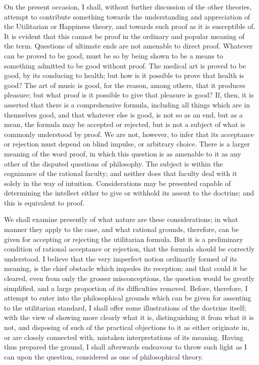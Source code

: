 \documentclass[12pt]{report}
\begin{document}
On the present occasion, I shall, without further discussion of the other theories, attempt to contribute something towards the understanding and appreciation of the Utilitarian or Happiness theory, and towards such proof as it is susceptible of. It is evident that this cannot be proof in the ordinary and popular meaning of the term. Questions of ultimate ends are not amenable to direct proof. Whatever can be proved to be good, must be so by being shown to be a means to something admitted to be good without proof. The medical art is proved to be good, by its conducing to health; but how is it possible to prove that health is good? The art of music is good, for the reason, among others, that it produces pleasure; but what proof is it possible to give that pleasure is good? If, then, it is asserted that there is a comprehensive formula, including all things which are in themselves good, and that whatever else is good, is not so as an end, but as a mean, the formula may be accepted or rejected, but is not a subject of what is commonly understood by proof. We are not, however, to infer that its acceptance or rejection must depend on blind impulse, or arbitrary choice. There is a larger meaning of the word proof, in which this question is as amenable to it as any other of the disputed questions of philosophy. The subject is within the cognizance of the rational faculty; and neither does that faculty deal with it solely in the way of intuition. Considerations may be presented capable of determining the intellect either to give or withhold its assent to the doctrine; and this is equivalent to proof.

We shall examine presently of what nature are these considerations; in what manner they apply to the case, and what rational grounds, therefore, can be given for accepting or rejecting the utilitarian formula. But it is a preliminary condition of rational acceptance or rejection, that the formula should be correctly understood. I believe that the very imperfect notion ordinarily formed of its meaning, is the chief obstacle which impedes its reception; and that could it be cleared, even from only the grosser misconceptions, the question would be greatly simplified, and a large proportion of its difficulties removed. Before, therefore, I attempt to enter into the philosophical grounds which can be given for assenting to the utilitarian standard, I shall offer some illustrations of the doctrine itself; with the view of showing more clearly what it is, distinguishing it from what it is not, and disposing of such of the practical objections to it as either originate in, or are closely connected with, mistaken interpretations of its meaning. Having thus prepared the ground, I shall afterwards endeavour to throw such light as I can upon the question, considered as one of philosophical theory.
\end{document}
